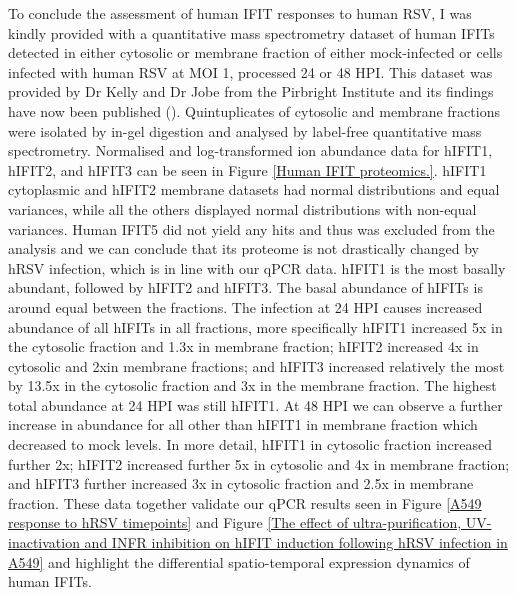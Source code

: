 To conclude the assessment of human IFIT responses to human RSV, I was kindly provided with a quantitative mass spectrometry dataset of human IFITs detected in either cytosolic or membrane fraction of either mock-infected or cells infected with human RSV at MOI 1, processed 24 or 48 HPI. This dataset was provided by Dr Kelly and Dr Jobe from the Pirbright Institute and its findings have now been published (\cite{Jobe2023ViralCondensates}). Quintuplicates of cytosolic and membrane fractions were isolated by in-gel digestion and analysed by label-free quantitative mass spectrometry. Normalised and log-transformed ion abundance data for hIFIT1, hIFIT2, and hIFIT3 can be seen in Figure \ref{Human IFIT proteomics.}. hIFIT1 cytoplasmic and hIFIT2 membrane datasets had normal distributions and equal variances, while all the others displayed normal distributions with non-equal variances. Human IFIT5 did not yield any hits and thus was excluded from the analysis and we can conclude that its proteome is not drastically changed by hRSV infection, which is in line with our qPCR data. hIFIT1 is the most basally abundant, followed by hIFIT2 and hIFIT3. The basal abundance of hIFITs is around equal between the fractions. The infection at 24 HPI causes increased abundance of all hIFITs in all fractions, more specifically hIFIT1 increased 5x in the cytosolic fraction and 1.3x in membrane fraction; hIFIT2 increased 4x in cytosolic and 2xin membrane fractions; and hIFIT3 increased relatively the most by 13.5x in the cytosolic fraction and 3x in the membrane fraction. The highest total abundance at 24 HPI was still hIFIT1. At 48 HPI we can observe a further increase in abundance for all other than hIFIT1 in membrane fraction which decreased to mock levels. In more detail, hIFIT1 in cytosolic fraction increased further 2x; hIFIT2 increased further 5x in cytosolic and 4x in membrane fraction; and hIFIT3 further increased 3x in cytosolic fraction and 2.5x in membrane fraction. These data together validate our qPCR results seen in Figure \ref{A549 response to hRSV timepoints} and Figure \ref{The effect of ultra-purification, UV-inactivation and INFR inhibition on hIFIT induction following hRSV infection in A549} and highlight the differential spatio-temporal expression dynamics of human IFITs.


